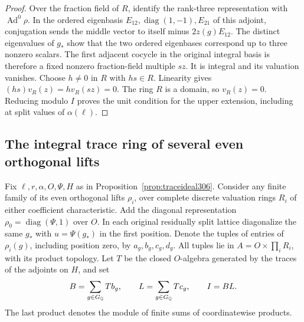 \documentclass[a4paper,11pt]{article}
\theoremstyle{definition}
\theoremstyle{remark}
\numberwithin{equation}{section}
\begin{document}
\begin{proof}
Over the fraction field of \(R\), identify the rank-three
representation with \(\operatorname{Ad}^0\rho\). In the
ordered eigenbasis
\(E_{12},\operatorname{diag}(1,-1),E_{21}\) of this adjoint,
conjugation sends the middle vector to itself minus
\(2z(g)E_{12}\). The distinct eigenvalues of \(g_*\) show
that the two ordered eigenbases correspond up to three
nonzero scalars. The first adjacent cocycle in the original
integral basis is therefore a fixed nonzero fraction-field
multiple \(s z\). It is integral and its valuation vanishes.
Choose \(h\ne0\) in \(R\) with \(hs\in R\). Linearity gives
\((hs)v_R(z)=h v_R(sz)=0\). The ring \(R\) is a domain,
so \(v_R(z)=0\). Reducing modulo \(I\) proves the unit
condition for the upper extension, including at split values
of \(\alpha(\ell)\).
\end{proof}

\subsection{The integral trace ring of several even orthogonal lifts}\label{nav:IV-58}
Fix \(\ell,r,\alpha,O,\Psi,H\) as in
Proposition~\ref{prop:traceideal306}. Consider any finite
family of its even orthogonal lifts \(\rho_i\), over complete
discrete valuation rings \(R_i\) of either coefficient
characteristic. Add the diagonal representation
\(\rho_0=\operatorname{diag}(\Psi,1)\) over \(O\). In each
original residually split lattice diagonalize the same
\(g_*\) with \(u=\Psi(g_*)\) in the first position. Denote the
tuples of entries of \(\rho_i(g)\), including position zero,
by \(a_g,b_g,c_g,d_g\). All tuples lie in
\(A=O\times\prod_i R_i\), with its product topology.
Let \(T\) be the closed \(O\)-algebra generated by the traces
of the adjoints on \(H\), and set
\[
            B=\sum_{g\in G_\mathbb Q}T b_g,\qquad
            L=\sum_{g\in G_\mathbb Q}T c_g,\qquad I=BL .
\]
The last product denotes the module of finite sums of
coordinatewise products.
\end{document}
